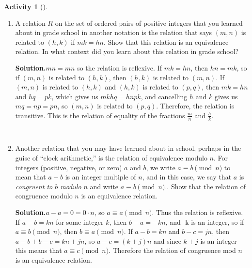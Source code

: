 \documentclass[10pt,]{book}
\theoremstyle{plain}
\theoremstyle{definition}
\newtheorem{activity}[project]{Activity}
\numberwithin{equation}{chapter}
\begin{document}
\begin{activity}[]
\begin{enumerate}[label=(\alph*)]
~\par
\item A relation \(R\) on the set of ordered pairs of positive integers that you learned about in grade school in another notation is the relation that says \((m,n)\) is related to \((h,k)\) if \(mk =hn\). Show that this relation is an equivalence relation. In what context did you learn about this relation in grade school?%
\par\medskip\noindent%
\textbf{Solution.}\quad \(mn=mn\) so the relation is reflexive. If \(mk=hn\), then \(hn=mk\), so if \((m,n)\) is related to \((h,k)\), then \((h,k)\) is related to \((m,n)\). If \((m,n)\) is related to \((h,k)\) and \((h,k)\) is related to \((p,q)\), then \(mk=hn\) and \(hq=pk\), which gives us \(mkhq=hnpk\), and cancelling \(h\) and \(k\) gives us \(mq=np=pn\), so \((m,n)\) is related to \((p,q)\). Therefore, the relation is transitive. This is the relation of equality of the fractions \(\frac{m}{ n}\) and \(\frac{h}{ k}\).%

~\par
\item Another relation that you may have learned about in school, perhaps in the guise of ``clock arithmetic,'' is the relation of equivalence modulo \(n\). For integers (positive, negative, or zero) \(a\) and \(b\), we write \(a
\equiv b \pmod{n}\) to mean that \(a-b\) is an integer multiple of \(n\), and in this case, we say that \(a\) is \emph{congruent to \(b\) modulo \(n\)} and write \(a\equiv b \pmod{n}\).. Show that the relation of congruence modulo \(n\) is an equivalence relation.%
\par\medskip\noindent%
\textbf{Solution.}\quad \(a-a=0=0\cdot n\), so \(a\equiv a\pmod{n}\). Thus the relation is reflexive. If \(a-b=kn\) for some integer \(k\), then \(b-a=-kn\), and -k is an integer, so if \(a\equiv b \pmod{n}\), then \(b\equiv a \pmod{n}\). If \(a-b=kn\) and \(b-c= jn\), then \(a-b+b-c=kn+jn\), so \(a-c=(k+j)n\) and since \(k+j\) is an integer this means that \(a\equiv c\pmod{n}\). Therefore the relation of congruence mod \(n\) is an equivalence relation.%


\end{enumerate}
\end{activity}
\end{document}
